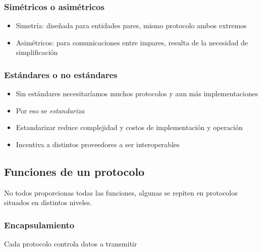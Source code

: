 \subsubsection{Simétricos o asimétricos} 
\begin{itemize}
    \item Simetría: diseñada para entidades pares, mismo protocolo ambos extremos
    \item Asimétricos: para comunicaciones entre impares,
    resulta de la necesidad de simplificación
\end{itemize}

\subsubsection{Estándares o no estándares}
\begin{itemize}
    \item Sin estándares necesitaríamos muchos protocolos y aun más 
    implementaciones 
    \item Por eso se \textit{estandariza}
    \item Estandarizar reduce complejidad y costos de implementación y operación
    \item Incentiva a distintos proveedores a ser interoperables
\end{itemize}

\subsection{Funciones de un protocolo}

No todos proporcionas todas las funciones, algunas se repiten
en protocolos situados en distintos niveles.

\subsubsection{Encapsulamiento}

Cada protocolo controla datos a transmitir